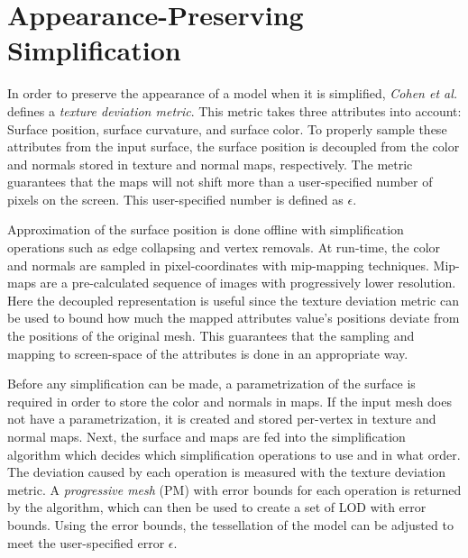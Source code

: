 \section{Appearance-Preserving Simplification} \label{sec:appearance-preserving_simplification}
In order to preserve the appearance of a model when it is simplified, \emph{Cohen et al.} \cite{cohen1998appearance} defines a \emph{texture deviation metric}. This metric takes three attributes into account: Surface position, surface curvature, and surface color. To properly sample these attributes from the input surface, the surface position is decoupled from the color and normals stored in texture and normal maps, respectively. The metric guarantees that the maps will not shift more than a user-specified number of pixels on the screen. This user-specified number is defined as $\epsilon$.

Approximation of the surface position is done offline with simplification operations such as edge collapsing and vertex removals. At run-time, the color and normals are sampled in pixel-coordinates with mip-mapping techniques. Mip-maps are a pre-calculated sequence of images with progressively lower resolution. Here the decoupled representation is useful since the texture deviation metric can be used to bound how much the mapped attributes value's positions deviate from the positions of the original mesh. This guarantees that the sampling and mapping to screen-space of the attributes is done in an appropriate way.

Before any simplification can be made, a parametrization of the surface is required in order to store the color and normals in maps. If the input mesh does not have a parametrization, it is created and stored per-vertex in texture and normal maps. Next, the surface and maps are fed into the simplification algorithm which decides which simplification operations to use and in what order. The deviation caused by each operation is measured with the texture deviation metric. A \emph{progressive mesh} (PM) with error bounds for each operation is returned by the algorithm, which can then be used to create a set of LOD with error bounds. Using the error bounds, the tessellation of the model can be adjusted to meet the user-specified error $\epsilon$.

